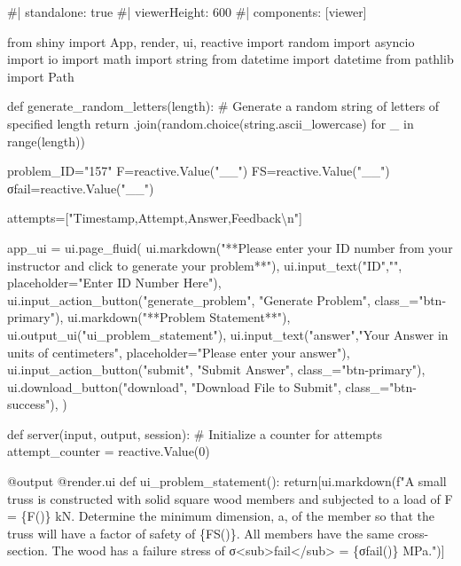 \documentclass[
  letterpaper,
  DIV=11,
  numbers=noendperiod]{scrreprt}
\newenvironment{Shaded}{\begin{snugshade}}{\end{snugshade}}
\newcommand{\NormalTok}[1]{\textcolor[rgb]{0.00,0.23,0.31}{#1}}
\begin{document}
\begin{Shaded}
\begin{Highlighting}[]
\NormalTok{\#| standalone: true}
\NormalTok{\#| viewerHeight: 600}
\NormalTok{\#| components: [viewer]}

\NormalTok{from shiny import App, render, ui, reactive}
\NormalTok{import random}
\NormalTok{import asyncio}
\NormalTok{import io}
\NormalTok{import math}
\NormalTok{import string}
\NormalTok{from datetime import datetime}
\NormalTok{from pathlib import Path}

\NormalTok{def generate\_random\_letters(length):}
\NormalTok{    \# Generate a random string of letters of specified length}
\NormalTok{    return \textquotesingle{}\textquotesingle{}.join(random.choice(string.ascii\_lowercase) for \_ in range(length))  }

\NormalTok{problem\_ID="157"}
\NormalTok{F=reactive.Value("\_\_")}
\NormalTok{FS=reactive.Value("\_\_")}
\NormalTok{σfail=reactive.Value("\_\_")}

\NormalTok{attempts=["Timestamp,Attempt,Answer,Feedback\textbackslash{}n"]}

\NormalTok{app\_ui = ui.page\_fluid(}
\NormalTok{    ui.markdown("**Please enter your ID number from your instructor and click to generate your problem**"),}
\NormalTok{    ui.input\_text("ID","", placeholder="Enter ID Number Here"),}
\NormalTok{    ui.input\_action\_button("generate\_problem", "Generate Problem", class\_="btn{-}primary"),}
\NormalTok{    ui.markdown("**Problem Statement**"),}
\NormalTok{    ui.output\_ui("ui\_problem\_statement"),}
\NormalTok{    ui.input\_text("answer","Your Answer in units of centimeters", placeholder="Please enter your answer"),}
\NormalTok{    ui.input\_action\_button("submit", "Submit Answer", class\_="btn{-}primary"),}
\NormalTok{    ui.download\_button("download", "Download File to Submit", class\_="btn{-}success"),}
\NormalTok{)}


\NormalTok{def server(input, output, session):}
\NormalTok{    \# Initialize a counter for attempts}
\NormalTok{    attempt\_counter = reactive.Value(0)}

\NormalTok{    @output}
\NormalTok{    @render.ui}
\NormalTok{    def ui\_problem\_statement():}
\NormalTok{        return[ui.markdown(f"A small truss is constructed with solid square wood members and subjected to a load of F = \{F()\} kN. Determine the minimum dimension, a, of the member so that the truss will have a factor of safety of \{FS()\}. All members have the same cross{-}section. The wood has a failure stress of σ\textless{}sub\textgreater{}fail\textless{}/sub\textgreater{} = \{σfail()\} MPa.")]}
    

\end{Highlighting}
\end{Shaded}
\end{document}
